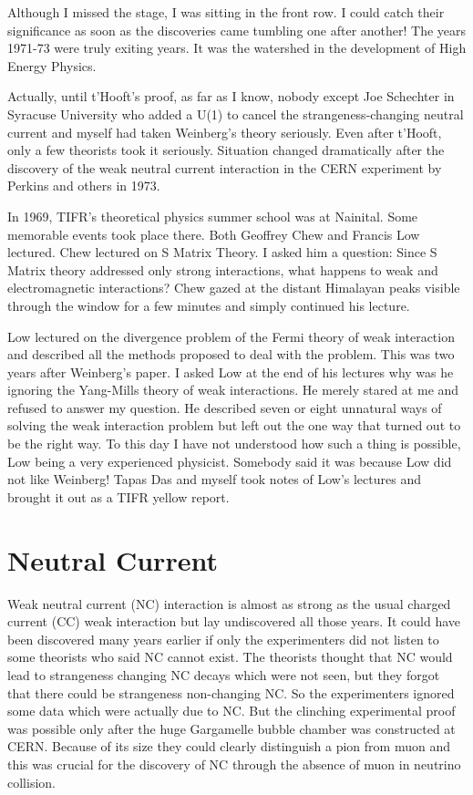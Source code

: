 Although I missed the stage, I was sitting in the front row. I could 
catch their significance as soon as the discoveries came tumbling one 
after another! The years 1971-73 were truly exiting years. It was the 
watershed in the development of High Energy Physics.
  
Actually, until t'Hooft's proof, as far as I know, nobody except Joe 
Schechter in Syracuse University who added a U(1) to cancel the 
strangeness-changing neutral current and myself had taken Weinberg's 
theory seriously. Even after t'Hooft, only a few theorists took it 
seriously. Situation changed dramatically after the discovery of the 
weak neutral current interaction in the CERN experiment by Perkins and 
others in 1973.

In 1969, TIFR's theoretical physics summer school was at Nainital. Some 
memorable events took place there. Both Geoffrey Chew and Francis Low 
lectured. Chew lectured on S Matrix Theory. I asked him a question: 
Since S Matrix theory addressed only strong interactions, what happens 
to weak and electromagnetic interactions? Chew gazed at the distant 
Himalayan peaks visible through the window for a few minutes and simply 
continued his lecture.

Low lectured on the divergence problem of the Fermi theory of weak 
interaction and described all the methods proposed to deal with the 
problem. This was two years after Weinberg's paper. I asked Low at the 
end of his lectures why was he ignoring the Yang-Mills theory of weak 
interactions. He merely stared at me and refused to answer my question. 
He described seven or eight unnatural ways of solving the weak 
interaction problem but left out the one way that turned out to be the 
right way. To this day I have not understood how such a thing is 
possible, Low being a very experienced physicist. Somebody said it was 
because Low did not like Weinberg! Tapas Das and myself took notes of 
Low's lectures and brought it out as a TIFR yellow report.

\section*{Neutral Current}
Weak neutral current (NC) interaction is almost as strong as the usual 
charged current (CC) weak interaction but lay undiscovered all those 
years. It could have been discovered many years earlier if only the 
experimenters did not listen to some theorists who said NC cannot exist. 
The theorists thought that NC would lead to strangeness changing NC 
decays which were not seen, but they forgot that there could be 
strangeness non-changing NC. So the experimenters ignored some data which 
were actually due to NC. But the clinching experimental proof was 
possible only after the huge Gargamelle bubble chamber was constructed 
at CERN. Because of its size they could clearly distinguish a pion 
from muon and this was crucial for the discovery of NC through the 
absence of muon in neutrino collision.

